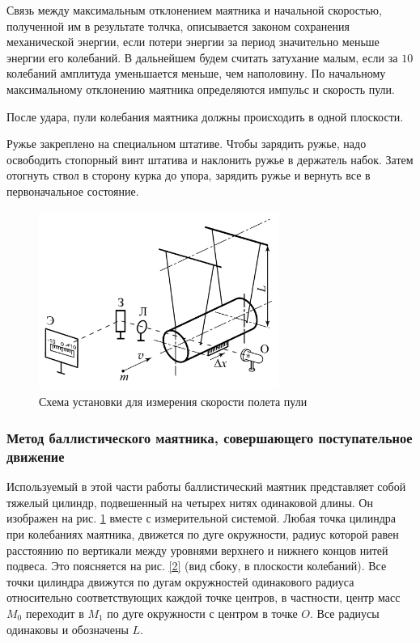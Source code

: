\documentclass[a4paper,12pt]{article}
\begin{document}
Связь между максимальным отклонением маятника и начальной скоростью, полученной им в результате толчка, описывается законом сохранения механической энергии, если потери энергии за период значительно меньше энергии его колебаний. В дальнейшем будем считать затухание малым, если за $10$ колебаний амплитуда уменьшается меньше, чем наполовину. По начальному максимальному отклонению маятника определяются импульс и скорость пули.

После удара, пули колебания маятника должны происходить в одной плоскости.

Ружье закреплено на специальном штативе. Чтобы зарядить ружье, надо освободить стопорный винт штатива и наклонить ружье в держатель набок. Затем отогнуть ствол в сторону курка до упора, зарядить ружье и вернуть все в первоначальное состояние.
\begin{figure}[h]
    \centering
    \includegraphics[width=0.7\textwidth]{1.2.1 1}
    \caption{Схема установки для измерения скорости полета пули}
    \label{1}
\end{figure}

\subsubsection*{Метод баллистического маятника, совершающего поступательное движение}

Используемый в этой части работы баллистический маятник представляет собой тяжелый цилиндр, подвешенный на четырех нитях одинаковой длины. Он изображен на рис. \ref{1} вместе с измерительной системой. Любая точка цилиндра при колебаниях маятника, движется по дуге окружности, радиус которой равен расстоянию по вертикали между уровнями верхнего и нижнего концов нитей подвеса. Это поясняется на рис. \ref{2} (вид сбоку, в плоскости колебаний). Все точки цилиндра движутся по дугам окружностей одинакового радиуса относительно соответствующих каждой точке центров, в частности, центр масс $M_0$ переходит в $M_1$ по дуге окружности с центром в точке $O$. Все радиусы одинаковы и обозначены $L$.
\end{document}
